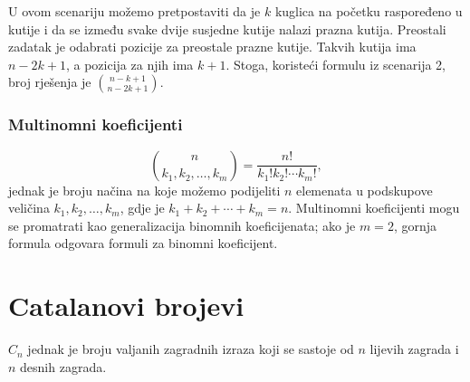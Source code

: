 \begin{center}
\end{center}

U ovom scenariju možemo pretpostaviti da je
$k$ kuglica na početku raspoređeno u kutije
i da se između svake dvije susjedne kutije
nalazi prazna kutija.
Preostali zadatak je odabrati
pozicije za preostale prazne kutije.
Takvih kutija ima $n-2k+1$, a
pozicija za njih ima $k+1$.
Stoga, koristeći formulu iz scenarija 2,
broj rješenja je
${n-k+1 \choose n-2k+1}$.

\subsubsection{Multinomni koeficijenti}


\[ {n \choose k_1,k_2,\ldots,k_m} = \frac{n!}{k_1! k_2! \cdots k_m!}, \]
jednak je broju načina na koje
možemo podijeliti $n$ elemenata u podskupove
veličina $k_1,k_2,\ldots,k_m$,
gdje je $k_1+k_2+\cdots+k_m=n$.
Multinomni koeficijenti mogu se promatrati kao
generalizacija binomnih koeficijenata;
ako je $m=2$, gornja formula
odgovara formuli za binomni koeficijent.

\section{Catalanovi brojevi}


$C_n$ jednak je
broju valjanih
zagradnih izraza koji se sastoje od
$n$ lijevih zagrada i $n$ desnih zagrada.

